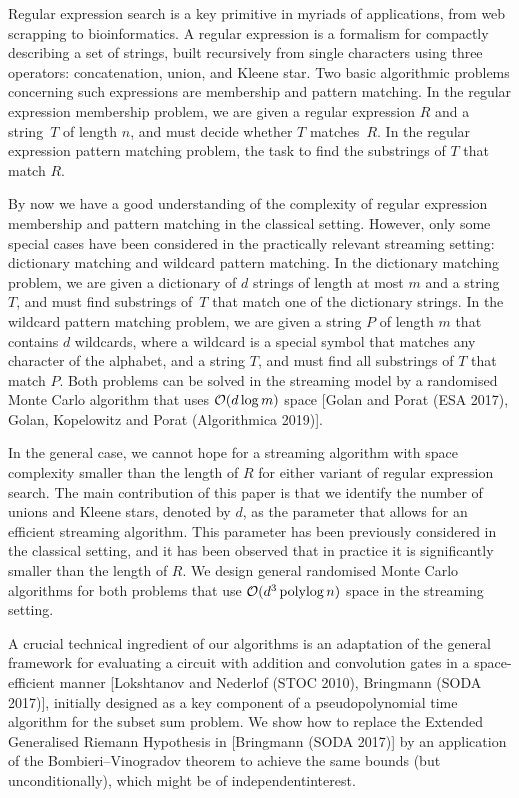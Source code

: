 \begin{small}
Regular expression search is a key primitive in myriads of applications, from web scrapping to bioinformatics.
A regular expression is a formalism for compactly describing a set of strings, built recursively from single characters
using three operators: concatenation, union, and Kleene star. Two basic algorithmic problems concerning
such expressions are membership and pattern matching.
In the regular expression membership problem, we are given a regular expression $R$ and a string~$T$ of length $n$, and must decide whether $T$ matches~$R$. In the regular expression pattern matching problem, the task to find the substrings of $T$ that match $R$. 

By now we have a good understanding of the complexity of regular expression membership and pattern matching
in the classical setting. However, only some special cases have been considered in the practically relevant streaming
setting:
dictionary matching and wildcard pattern matching. In the dictionary matching problem, we are given a dictionary of $d$ strings of
length at most $m$ and a string $T$, and must find substrings of~$T$ that match one of the dictionary strings. In the wildcard pattern
matching problem, we are given a string $P$ of length $m$ that contains $d$ wildcards, where a wildcard is a special symbol that matches
any character of the alphabet, and a string $T$, and must find all substrings of $T$ that match $P$. Both problems can be solved in the
streaming model by a randomised Monte Carlo algorithm that uses $\mathcal{O}(d \log m)$ space [Golan and Porat (ESA 2017), Golan, Kopelowitz
and Porat (Algorithmica 2019)]. 

In the general case, we cannot hope for a streaming algorithm with space complexity smaller than the length of $R$ for either variant
of regular expression search.
The main contribution of this paper is that we identify the number of unions and Kleene stars, denoted by $d$, as the parameter
that allows for an efficient streaming algorithm. This parameter has been previously considered in the classical setting, and
it has been observed that in practice it is significantly smaller than the length of $R$.
We design general randomised Monte Carlo algorithms for both problems that use $\mathcal{O}(d^3 \operatorname{polylog} n)$ space
in the streaming setting.

A crucial technical ingredient of our algorithms is an adaptation of the general framework for evaluating a circuit with addition and convolution gates in a space-efficient manner [Lokshtanov and Nederlof (STOC 2010), Bringmann (SODA 2017)], initially designed as a key component of a pseudopolynomial time algorithm for the subset sum problem. We show how to replace the Extended Generalised Riemann Hypothesis in [Bringmann (SODA 2017)] by an application of the Bombieri--Vinogradov theorem to achieve the same bounds (but unconditionally), which might be of independentinterest.
\end{small}

